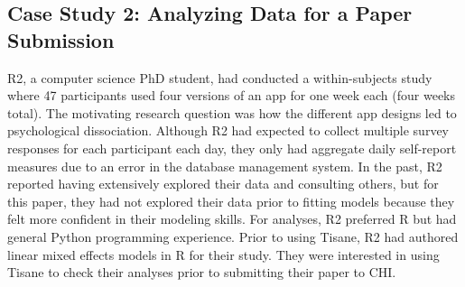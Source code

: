\subsection{Case Study 2: Analyzing Data for a Paper Submission}
R2, a computer science PhD student, had conducted a within-subjects study where
47 participants used four versions of an app for one week each (four
weeks total). The motivating research question was how the different app designs
led to %
psychological dissociation. %
Although R2 had expected to collect multiple survey responses for each
participant each day, they only had
aggregate daily self-report measures due to an error in the database management system.
In the past, R2 reported having extensively explored their data and
consulting others, but for this paper, they had not explored their data prior to
fitting models because they felt more confident in their modeling skills. For
analyses, R2 preferred R but had general Python programming experience. Prior
to using Tisane, R2 had authored linear mixed effects models in R for their
study. They were interested in using Tisane to check their analyses prior to
submitting their paper to CHI.


\def\numberofinstances{\texttt{number\_of\_instances}\xspace}


